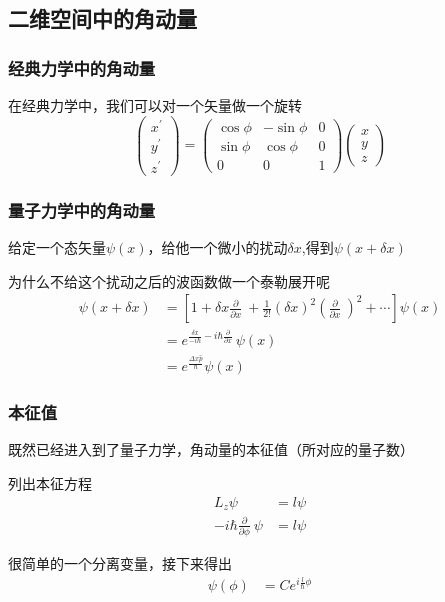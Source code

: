 \documentclass{article}
\newcommand{\pmthree}[9]{
    \begin{pmatrix}
        #1&#2&#3\\
        #4&#5&#6\\
        #7&#8&#9
    \end{pmatrix}
}
\newcommand{\Da}[2]{\frac{\partial}{\partial#2}#1}
\begin{document}
\subsection{二维空间中的角动量}
\subsubsection{经典力学中的角动量}
在经典力学中，我们可以对一个矢量做一个旋转
\begin{equation*}
    \begin{pmatrix}
        x^{'} \\
        y^{'} \\
        z^{'}
    \end{pmatrix}
    =
    \pmthree{\cos\phi}{-\sin\phi}{0}{\sin\phi}{\cos\phi}{0}{0}{0}{1}
    \begin{pmatrix}
        x \\
        y \\
        z
    \end{pmatrix}
\end{equation*}

\subsubsection{量子力学中的角动量}
给定一个态矢量$\psi(x)$，给他一个微小的扰动$\delta x$,得到$\psi(x+\delta x)$

为什么不给这个扰动之后的波函数做一个泰勒展开呢
\begin{align*}
    \psi(x+\delta x)&=\left[1+\delta x\Da{~}{x}+\frac{1}{2!}(\delta x)^2\left(\Da{~}{x}\right)^2+\cdots\right]\psi(x)\\
    &=e^{\frac{\delta x}{-i\hbar}-i\hbar\Da{~}{x}}\psi(x)\\
    &=e^{\frac{\Delta x \hat{p}}{\hbar}}\psi(x)
\end{align*}
\subsubsection{本征值}
既然已经进入到了量子力学，角动量的本征值（所对应的量子数）

列出本征方程
\begin{align*}
    L_z\psi&=l\psi\\
    -i\hbar\Da{~}{\phi}\psi&=l\psi
\end{align*}

很简单的一个分离变量，接下来得出
\begin{align*}
    \psi(\phi)&=Ce^{i\frac{l}{\hbar}\phi}
\end{align*}
\end{document}
